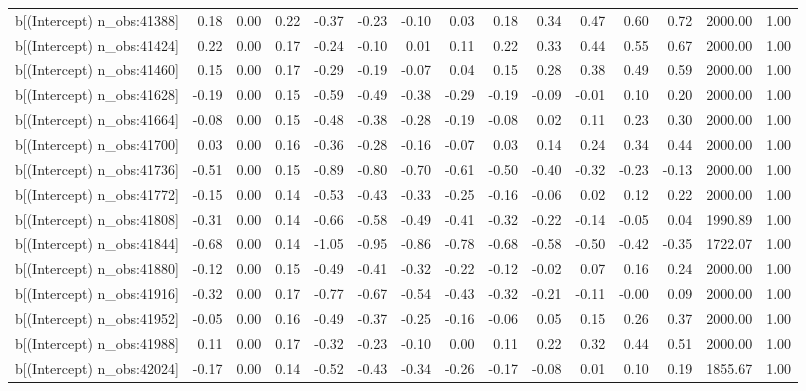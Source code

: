 \begin{table}[ht]
\begin{tabular}{rrrrrrrrrrrrrrr}
  b[(Intercept) n\_obs:41388] & 0.18 & 0.00 & 0.22 & -0.37 & -0.23 & -0.10 & 0.03 & 0.18 & 0.34 & 0.47 & 0.60 & 0.72 & 2000.00 & 1.00 \\ 
  b[(Intercept) n\_obs:41424] & 0.22 & 0.00 & 0.17 & -0.24 & -0.10 & 0.01 & 0.11 & 0.22 & 0.33 & 0.44 & 0.55 & 0.67 & 2000.00 & 1.00 \\ 
  b[(Intercept) n\_obs:41460] & 0.15 & 0.00 & 0.17 & -0.29 & -0.19 & -0.07 & 0.04 & 0.15 & 0.28 & 0.38 & 0.49 & 0.59 & 2000.00 & 1.00 \\ 
  b[(Intercept) n\_obs:41628] & -0.19 & 0.00 & 0.15 & -0.59 & -0.49 & -0.38 & -0.29 & -0.19 & -0.09 & -0.01 & 0.10 & 0.20 & 2000.00 & 1.00 \\ 
  b[(Intercept) n\_obs:41664] & -0.08 & 0.00 & 0.15 & -0.48 & -0.38 & -0.28 & -0.19 & -0.08 & 0.02 & 0.11 & 0.23 & 0.30 & 2000.00 & 1.00 \\ 
  b[(Intercept) n\_obs:41700] & 0.03 & 0.00 & 0.16 & -0.36 & -0.28 & -0.16 & -0.07 & 0.03 & 0.14 & 0.24 & 0.34 & 0.44 & 2000.00 & 1.00 \\ 
  b[(Intercept) n\_obs:41736] & -0.51 & 0.00 & 0.15 & -0.89 & -0.80 & -0.70 & -0.61 & -0.50 & -0.40 & -0.32 & -0.23 & -0.13 & 2000.00 & 1.00 \\ 
  b[(Intercept) n\_obs:41772] & -0.15 & 0.00 & 0.14 & -0.53 & -0.43 & -0.33 & -0.25 & -0.16 & -0.06 & 0.02 & 0.12 & 0.22 & 2000.00 & 1.00 \\ 
  b[(Intercept) n\_obs:41808] & -0.31 & 0.00 & 0.14 & -0.66 & -0.58 & -0.49 & -0.41 & -0.32 & -0.22 & -0.14 & -0.05 & 0.04 & 1990.89 & 1.00 \\ 
  b[(Intercept) n\_obs:41844] & -0.68 & 0.00 & 0.14 & -1.05 & -0.95 & -0.86 & -0.78 & -0.68 & -0.58 & -0.50 & -0.42 & -0.35 & 1722.07 & 1.00 \\ 
  b[(Intercept) n\_obs:41880] & -0.12 & 0.00 & 0.15 & -0.49 & -0.41 & -0.32 & -0.22 & -0.12 & -0.02 & 0.07 & 0.16 & 0.24 & 2000.00 & 1.00 \\ 
  b[(Intercept) n\_obs:41916] & -0.32 & 0.00 & 0.17 & -0.77 & -0.67 & -0.54 & -0.43 & -0.32 & -0.21 & -0.11 & -0.00 & 0.09 & 2000.00 & 1.00 \\ 
  b[(Intercept) n\_obs:41952] & -0.05 & 0.00 & 0.16 & -0.49 & -0.37 & -0.25 & -0.16 & -0.06 & 0.05 & 0.15 & 0.26 & 0.37 & 2000.00 & 1.00 \\ 
  b[(Intercept) n\_obs:41988] & 0.11 & 0.00 & 0.17 & -0.32 & -0.23 & -0.10 & 0.00 & 0.11 & 0.22 & 0.32 & 0.44 & 0.51 & 2000.00 & 1.00 \\ 
  b[(Intercept) n\_obs:42024] & -0.17 & 0.00 & 0.14 & -0.52 & -0.43 & -0.34 & -0.26 & -0.17 & -0.08 & 0.01 & 0.10 & 0.19 & 1855.67 & 1.00 \\ 

\end{tabular}
\end{table}

